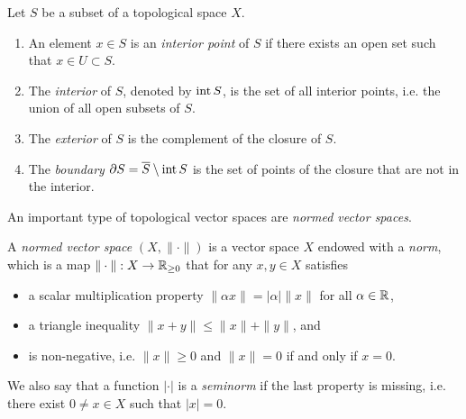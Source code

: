 \begin{definition}
    Let $S$ be a subset of a topological space $X$.
    \begin{enumerate}
        \item An element $x\in S$ is an \emph{interior point} of $S$ if there exists an open set such that $x\in U\subset S$.
        \item The \emph{interior} of $S$, denoted by $\operatorname{\text{int}} S$, is the set of all interior points, i.e. the union of all open subsets of $S$.
        \item The \emph{exterior} of $S$ is the complement of the closure of $S$.
        \item The \emph{boundary} $\partial S = \overline{S}\setminus\operatorname{\text{int}} S$ is the set of points of the closure that are not in the interior. 
    \end{enumerate}       
\end{definition}

An important type of topological vector spaces are \emph{normed vector spaces}.
\begin{definition}
    A \emph{normed vector space} $(X,\|\cdot\|)$ is a vector space $X$ endowed with a \emph{norm}, which is a map $\|\cdot\|:X\to \mathbb{R}_{\geq 0}$ that for any $x,y\in X$ satisfies
    \begin{itemize}
        \item a scalar multiplication property $\|\alpha x\|=|\alpha|\|x\|$ for all $\alpha\in\mathbb{R}$,
        \item a triangle inequality $\|x+y\|\leq \|x\|+\|y\|$, and 
        \item is non-negative, i.e. $\|x\|\geq 0$ and $\|x\|=0$ if and only if $x=0$.
    \end{itemize}
    We also say that a function $|\cdot|$ is a \emph{seminorm} if the last property is missing, i.e. there exist $0 \neq x\in X$ such that $|x|=0$.
\end{definition}

